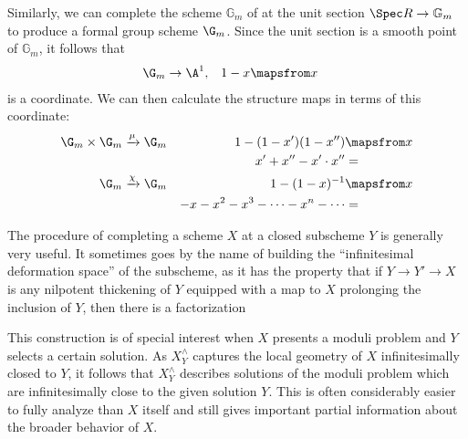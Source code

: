 \begin{example}
Similarly, we can complete the scheme $\mathbb G_m$ of  at the unit section $\Spec R \to \mathbb G_m$ to produce a formal group scheme $\G_m$.  Since the unit section is a smooth point of $\mathbb G_m$, it follows that
\begin{align*}
\G_m & \to \A^1, & 1-x & \mapsfrom x
\end{align*}
is a coordinate.  We can then calculate the structure maps in terms of this coordinate:
\begin{align*}
\G_m \times \G_m & \xrightarrow{\mu} \G_m & 1 - (1 - x')(1 - x'') & \mapsfrom x \\
& & x' + x'' - x' \cdot x'' & = \\
\G_m & \xrightarrow{\chi} \G_m & 1 - (1 - x)^{-1} & \mapsfrom x \\
& & -x -x^2 -x^3 - \cdots - x^n - \cdots & = 
\end{align*}
\end{example}

\begin{remark}\label{WhyDeformationTheory}
The procedure of completing a scheme $X$ at a closed subscheme $Y$ is generally very useful.  It sometimes goes by the name of building the ``infinitesimal deformation space'' of the subscheme, as it has the property that if $Y \to Y' \to X$ is any nilpotent thickening of $Y$ equipped with a map to $X$ prolonging the inclusion of $Y$, then there is a factorization
\begin{center}
\end{center}
This construction is of special interest when $X$ presents a moduli problem and $Y$ selects a certain solution.  As $X^\wedge_Y$ captures the local geometry of $X$ infinitesimally closed to $Y$, it follows that $X^\wedge_Y$ describes solutions of the moduli problem which are infinitesimally close to the given solution $Y$.  This is often considerably easier to fully analyze than $X$ itself and still gives important partial information about the broader behavior of $X$.
\end{remark}

